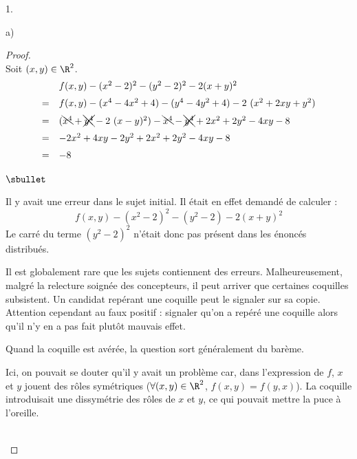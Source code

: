 \begin{noliste}{1.}
\begin{noliste}{a)}
    \begin{proof}~\\%
      Soit $(x, y) \in \R^2$.
      \[
      \begin{array}{cl}
        & f(x, y) -(x^{2}-2)^{2}-(y^{2}-2)^{2}-2(x + y)^{2}
        \\[.2cm]
        = & f(x, y) -(x^4 - 4 x^2 + 4) - (y^4 - 4 y^2 + 4) - 2 \ (x^2
        + 2 xy + y^2)
        \\[.2cm]
        = & (\bcancel{x^4} + \xcancel{y^4} - 2 \ (x - y)^2) -
        \bcancel{x^4} - \xcancel{y^4} +2 x^2 + 2 y^2 -4  xy - 8
        \\[.2cm]
        = & - 2 x^2 + 4 xy - 2 y^2 + 2 x^2 + 2 y^2 -4  xy - 8
        \\[.2cm]
        = & - 8
      \end{array}
      \]
      \begin{remark}%
        \begin{noliste}{$\sbullet$}
        \item Il y avait une erreur dans le sujet initial. Il était en
          effet demandé de calculer :
          \[
          f(x, y) - (x^{2}-2)^{2} - (y^{2}-2) - 2(x + y)^{2}
          \]
          Le carré du terme $(y^{2}-2)^2$ n'était donc pas présent
          dans les énoncés distribués.
        \item Il est globalement rare que les sujets contiennent des
          erreurs. Malheureusement, malgré la relecture soignée des
          concepteurs, il peut arriver que certaines coquilles
          subsistent. Un candidat repérant une coquille peut le
          signaler sur sa copie. Attention cependant au faux positif :
          signaler qu'on a repéré une coquille alors qu'il n'y en a
          pas fait plutôt mauvais effet.
        \item Quand la coquille est avérée, la question sort
          généralement du barème.
        \item Ici, on pouvait se douter qu'il y avait un problème car,
          dans l'expression de $f$, $x$ et $y$ jouent des rôles
          symétriques ($\forall (x, y) \in \R^2$, $f(x, y) = f(y,
          x)$). La coquille introduisait une dissymétrie des rôles de
          $x$ et $y$, ce qui pouvait mettre la puce à l'oreille.
        \end{noliste}
      \end{remark}~\\[-1cm]
    \end{proof}



\end{noliste}
\end{noliste}
